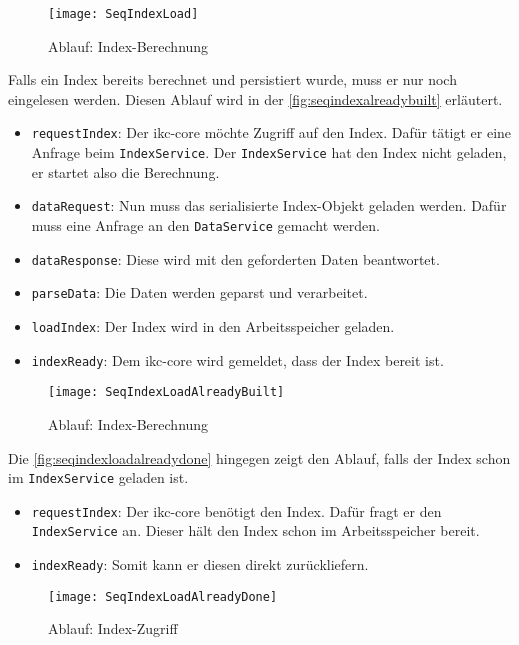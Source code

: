     \begin{figure}[H]
    \centering
    \texttt{[image: SeqIndexLoad]}
    \caption{Ablauf: Index-Berechnung}
    \label{fig:seqindexload}
    \end{figure}

Falls ein Index bereits berechnet und persistiert wurde, muss er nur noch eingelesen werden. Diesen Ablauf wird in der \autoref{fig:seqindexalreadybuilt} erläutert. 
\begin{itemize}
    \item \texttt{requestIndex}: Der \gls{ikc-core} möchte Zugriff auf den Index. Dafür tätigt er eine Anfrage beim \texttt{IndexService}. Der \texttt{IndexService} hat den Index nicht geladen, er startet also die Berechnung.
    \item \texttt{dataRequest}: Nun muss das serialisierte Index-Objekt geladen werden. Dafür muss eine Anfrage an den \texttt{DataService} gemacht werden.
    \item \texttt{dataResponse}: Diese wird mit den geforderten Daten beantwortet.
    \item \texttt{parseData}: Die Daten werden geparst und verarbeitet.
    \item \texttt{loadIndex}: Der Index wird in den Arbeitsspeicher geladen.
    \item \texttt{indexReady}: Dem \gls{ikc-core} wird gemeldet, dass der Index bereit ist.
\end{itemize}

    \begin{figure}[H]
    \centering
    \texttt{[image: SeqIndexLoadAlreadyBuilt]}
    \caption{Ablauf: Index-Berechnung}
    \label{fig:seqindexalreadybuilt}
    \end{figure}
    
    
Die \autoref{fig:seqindexloadalreadydone} hingegen zeigt den Ablauf, falls der Index schon im \texttt{IndexService} geladen ist.

\begin{itemize}
    \item \texttt{requestIndex}: Der \gls{ikc-core} benötigt den Index. Dafür fragt er den \texttt{IndexService} an. Dieser hält den Index schon im Arbeitsspeicher bereit.
    \item \texttt{indexReady}: Somit kann er diesen direkt zurückliefern.
\end{itemize}
    
    \begin{figure}[H]
    \centering
    \texttt{[image: SeqIndexLoadAlreadyDone]}
    \caption{Ablauf: Index-Zugriff}
    \label{fig:seqindexloadalreadydone}
    \end{figure}

